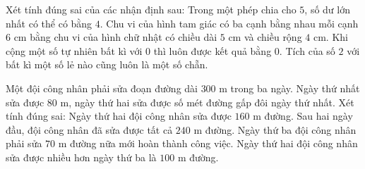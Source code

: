 \begin{ex} %
Xét tính đúng sai của các nhận định sau:
\choiceTF
{\True Trong một phép chia cho $5$, số dư lớn nhất có thể có bằng $4$.}
{\True Chu vi của hình tam giác có ba cạnh bằng nhau mỗi cạnh $6\text{ cm}$ bằng chu vi của hình chữ nhật có chiều dài $5\text{ cm}$ và chiều rộng $4\text{ cm}$.}
{Khi cộng một số tự nhiên bất kì với $0$ thì luôn được kết quả bằng $0$.}
{\True Tích của số $2$ với bất kì một số lẻ nào cũng luôn là một số chẵn.}
\end{ex}

\begin{ex} %
Một đội công nhân phải sửa đoạn đường dài $300\text{ m}$ trong ba ngày. Ngày thứ nhất sửa được $80\text{ m}$, ngày thứ hai sửa được số mét đường gấp đôi ngày thứ nhất. Xét tính đúng sai:
\choiceTF
{\True Ngày thứ hai đội công nhân sửa được $160\text{ m}$ đường.}
{\True Sau hai ngày đầu, đội công nhân đã sửa được tất cả $240\text{ m}$ đường.}
{Ngày thứ ba đội công nhân phải sửa $70\text{ m}$ đường nữa mới hoàn thành công việc.}
{\True Ngày thứ hai đội công nhân sửa được nhiều hơn ngày thứ ba là $100\text{ m}$ đường.}
\end{ex}

